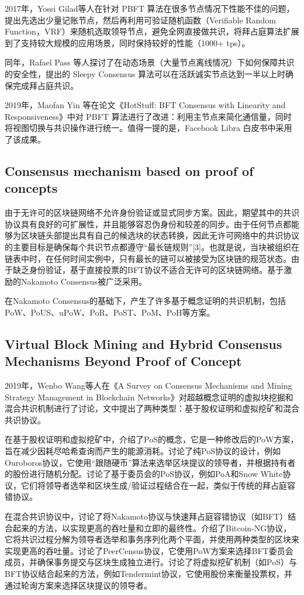 \documentclass[a4paper,twoside]{scrbook}
\begin{document}
\begin{CJK}{UTF8}{gbsn}
2017年，Yossi Gilad\cite{gilad2017algorand}等人在针对 PBFT 算法在很多节点情况下性能不佳的问题，提出先选出少量记账节点，然后再利用可验证随机函数（Verifiable Random Function，VRF）来随机选取领导节点，避免全网直接做共识，将拜占庭算法扩展到了支持较大规模的应用场景，同时保持较好的性能（1000+ tps）。

同年，Rafael Pass \cite{pass2017sleepy}等人探讨了在动态场景（大量节点离线情况）下如何保障共识的安全性，提出的 Sleepy Consensus 算法可以在活跃诚实节点达到一半以上时确保完成拜占庭共识。

2019年，Maofan Yin 等在论文《HotStuff: BFT Consensus with Linearity and Responsiveness》\cite{yin2019hotstuff}中对 PBFT 算法进行了改进：利用主节点来简化通信量，同时将视图切换与共识操作进行统一。值得一提的是，Facebook Libra 白皮书中采用了该成果。

\subsection{Consensus mechanism based on proof of concepts}
由于无许可的区块链网络不允许身份验证或显式同步方案。因此，期望其中的共识协议具有良好的可扩展性，并且能够容忍伪身份和较差的同步。由于任何节点都能够为区块链头部提出具有自己的候选块的状态转换，因此无许可网络中的共识协议的主要目标是确保每个共识节点都遵守“最长链规则”[3]。也就是说，当块被组织在链表中时，在任何时间实例中，只有最长的链可以被接受为区块链的规范状态。由于缺乏身份验证，基于直接投票的BFT协议不适合无许可的区块链网络。基于激励的Nakamoto Consensus\cite{nakamoto2008bitcoin}被广泛采用。

在Nakamoto Consensus的基础下，产生了许多基于概念证明的共识机制，包括PoW、PoUS、uPoW、PoR、PoST、PoM、PoH等方案。

\subsection{Virtual Block Mining and Hybrid Consensus Mechanisms Beyond Proof of Concept}
2019年，Wenbo Wang等人在《A Survey on Consensus Mechanisms and Mining Strategy Management in Blockchain Networks》\cite{wang2019survey}对超越概念证明的虚拟块挖掘和混合共识机制进行了讨论，文中提出了两种类型：基于股权证明和虚拟挖矿和混合共识协议。

在基于股权证明和虚拟挖矿中，介绍了PoS的概念，它是一种修改后的PoW方案，旨在减少因耗尽哈希查询而产生的能源消耗。讨论了纯PoS协议的设计，例如Ouroboros协议，它使用“跟随硬币”算法来选举区块提议的领导者，并根据持有者的股份进行随机分配。讨论了基于委员会的PoS协议，例如PoA和Snow White协议，它们将领导者选举和区块生成/验证过程结合在一起，类似于传统的拜占庭容错协议。

在混合共识协议中，讨论了将Nakamoto协议与快速拜占庭容错协议（如BFT）结合起来的方法，以实现更高的吞吐量和立即的最终性。介绍了Bitcoin-NG协议，它将共识过程分解为领导者选举和事务序列化两个平面，并使用两种类型的区块来实现更高的吞吐量。讨论了PeerCensus协议，它使用PoW方案来选择BFT委员会成员，并确保事务提交与区块生成独立进行。讨论了将虚拟挖矿机制（如PoS）与BFT协议结合起来的方法，例如Tendermint协议，它使用股份来衡量投票权，并通过轮询方案来选择区块提议的领导者。
\printbibliography
\end{CJK}
\end{document}
